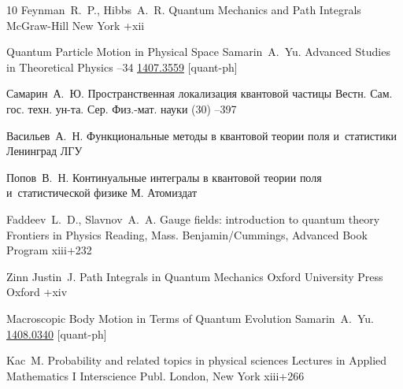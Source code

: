 \begin{thebibliography}{10}
\by Feynman~R.~P., Hibbs~A.~R.
\book Quantum Mechanics and Path Integrals
\publ McGraw-Hill
\publaddr New York
+xii


\paper Quantum Particle Motion in Physical Space
\by Samarin~A.~Yu.
\jour  Advanced Studies in Theoretical Physics
--34
\arxiv \href{http://arxiv.org/abs/1407.3559}{1407.3559} [quant-ph]


\by Самарин~А.~Ю.
\paper Пространственная локализация квантовой частицы
\jour Вестн. Сам. гос. техн. ун-та. Сер. Физ.-мат. науки
(30)
--397

\by Васильев~А.~Н.
\book Функциональные методы в квантовой теории поля и~статистики
\publaddr  Ленинград
\publ ЛГУ

\by Попов~В.~Н.
\book Континуальные интегралы в квантовой теории поля и~статистической физике
\publaddr  М.
\publ Атомиздат

\by Faddeev~L.~D., Slavnov~A.~A.
\book Gauge fields: introduction to quantum theory
\serial Frontiers in Physics
\publaddr  Reading, Mass.
\publ Benjamin/Cummings, Advanced Book Program
\totalpages xiii+232 

\by Zinn Justin~J.
\book Path Integrals in Quantum Mechanics
\publ Oxford University Press
\publaddr Oxford
+xiv


\preprint  Macroscopic Body Motion in Terms of Quantum Evolution
\by Samarin~A.~Yu.
\arxiv \href{http://arxiv.org/abs/1408.0340}{1408.0340} [quant-ph]


\by Kac~M.
\book Probability and related topics in physical sciences
\serial Lectures in Applied Mathematics
\vol I
\publ Interscience Publ.
\publaddr London, New York 
\totalpages xiii+266 


\end{thebibliography}


